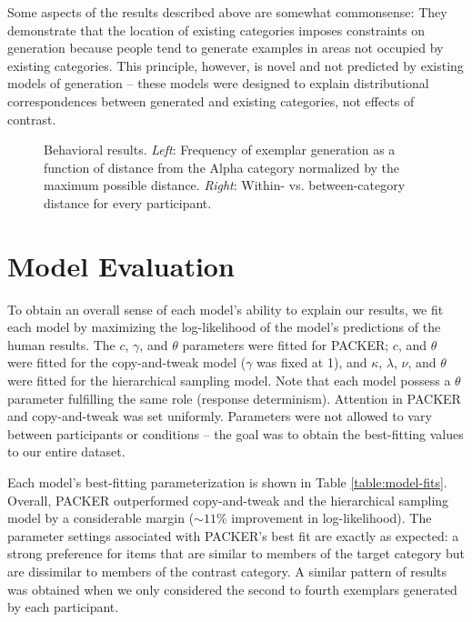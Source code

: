 \documentclass[10pt,letterpaper]{article}
\newcommand\inputpgf[2]{{
\let\pgfimageWithoutPath\pgfimage
\renewcommand{\pgfimage}[2][]{\pgfimageWithoutPath[##1]{#1/##2}}

}}
\begin{document}
Some aspects of the results described above are somewhat commonsense: They demonstrate that the location of existing categories imposes constraints on generation because people tend to generate examples in areas not occupied by existing categories. This principle, however, is novel and not predicted by existing models of generation -- these models were designed to explain distributional correspondences between generated and existing categories, not effects of contrast.  

\begin{figure}
    \begin{center}
    \inputpgf{figs/}{distance.figs.pgf}
    \caption{Behavioral results. \textit{Left}: Frequency of exemplar generation as a function of distance from the Alpha category normalized by the maximum possible distance. \textit{Right}: Within- vs. between-category distance for every participant. }
    \label{fig:distance.figs}
    \end{center}
\end{figure}


\section{Model Evaluation}
To obtain an overall sense of each model's ability to explain our results, we fit each model by maximizing the log-likelihood of the model's predictions of the human results. The $c$, $\gamma$, and $\theta$ parameters were fitted for PACKER; $c$, and $\theta$ were fitted for the copy-and-tweak model ($\gamma$ was fixed at 1), and $\kappa$, $\lambda$, $\nu$, and $\theta$ were fitted for the hierarchical sampling model. Note that each model possess a $\theta$ parameter fulfilling the same role (response determinism). Attention in PACKER and copy-and-tweak was set uniformly. Parameters were not allowed to vary between participants or conditions -- the goal was to obtain the best-fitting values to our entire dataset.

Each model's best-fitting parameterization is shown in Table \ref{table:model-fits}. Overall, PACKER outperformed copy-and-tweak and the hierarchical sampling model by a considerable margin ($\sim11\%$ improvement in log-likelihood). The parameter settings associated with PACKER's best fit are exactly as expected: a strong preference for items that are similar to members of the target category but are dissimilar to members of the contrast category. A similar pattern of results was obtained when we only considered the second to fourth exemplars generated by each participant.
\end{document}
